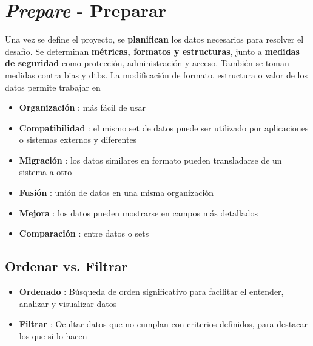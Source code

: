 

\section{\textit{Prepare} - Preparar}
Una vez se define el proyecto, se \textbf{planifican} los datos necesarios para resolver el desafío. Se determinan \textbf{métricas, formatos y estructuras}, junto a \textbf{medidas de seguridad} como protección, administración y acceso. También se toman medidas contra \gls{bias} y \gls{dtbs}. La modificación de formato, estructura o valor de los datos permite trabajar en
\begin{itemize}
    \item {\textbf{Organización} : más fácil de usar}
    \item {\textbf{Compatibilidad} : el mismo set de datos puede ser utilizado por aplicaciones o sistemas externos y diferentes}
    \item {\textbf{Migración} : los datos similares en formato pueden transladarse de un sistema a otro}
    \item {\textbf{Fusión} : unión de datos en una misma organización}
    \item {\textbf{Mejora} : los datos pueden mostrarse en campos más detallados}
    \item {\textbf{Comparación} : entre datos o sets}
\end{itemize}

\subsection{Ordenar vs. Filtrar}
\begin{itemize}
    \item {\textbf{Ordenado} : Búsqueda de orden significativo para facilitar el entender, analizar y visualizar datos}
    \item {\textbf{Filtrar} : Ocultar datos que no cumplan con criterios definidos, para destacar los que si lo hacen}
\end{itemize}

